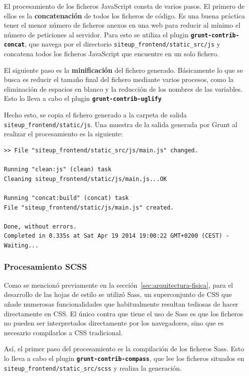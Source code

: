 El procesamiento de los ficheros JavaScript consta de varios pasos. El primero
de ellos es la \textbf{concatenación} de todos los ficheros de código. Es una
buena práctica tener el menor número de ficheros anexos en una web para reducir
al mínimo el número de peticiones al servidor. Para esto se utiliza el plugin
\textbf{\texttt{grunt-contrib-concat}}, que navega por el directorio
\texttt{siteup\_frontend/static\_src/js} y concatena todos los ficheros
JavaScript que encuentre en un solo fichero.

El siguiente paso es la \textbf{minificación} del fichero generado. Básicamente
lo que se busca es reducir el tamaño final del fichero mediante varios procesos,
como la eliminación de espacios en blanco y la reducción de los nombres de las
variables. Esto lo lleva a cabo el plugin \textbf{\texttt{grunt-contrib-uglify}}

Hecho esto, se copia el fichero generado a la carpeta de salida
\texttt{siteup\_frontend/static/js}. Una muestra de la salida generada por Grunt
al realizar el procesamiento es la siguiente:

\begin{verbatim}
>> File "siteup_frontend/static_src/js/main.js" changed.

Running "clean:js" (clean) task
Cleaning siteup_frontend/static/js/main.js...OK

Running "concat:build" (concat) task
File "siteup_frontend/static/js/main.js" created.

Done, without errors.
Completed in 0.335s at Sat Apr 19 2014 19:00:22 GMT+0200 (CEST) - Waiting...
\end{verbatim}

\subsubsection{Procesamiento SCSS}

Como se mencionó previamente en la sección~\ref{sec:arquitectura-fisica},
para el desarrollo de las hojas de estilo se utilizó Sass, un superconjunto de
CSS que añade numerosas funcionalidades que habitualmente resultan tediosas de
hacer directamente en CSS. El único contra que tiene el uso de Sass es que los
ficheros no pueden ser interpretados directamente por los navegadores, sino que
es necesario compilarlos a CSS tradicional.

Así, el primer paso del procesamiento es la compilación de los ficheros
Sass. Esto lo lleva a cabo el plugin \textbf{\texttt{grunt-contrib-compass}},
que lee los ficheros situados en \texttt{siteup\_frontend/static\_src/scss} y
realiza la generación.

